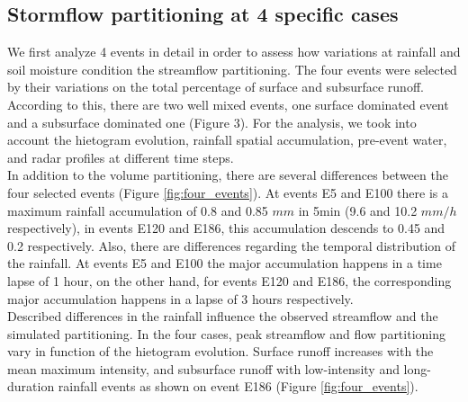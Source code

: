 \documentclass[preprint,12pt]{elsarticle}
\begin{document}
\subsection{Stormflow partitioning at 4 specific cases}

We first analyze 4 events in detail in order to assess how variations at rainfall and soil moisture condition the streamflow partitioning. The four events were selected by their variations on the total percentage of surface and subsurface runoff.  According to this, there are two well mixed events, one surface dominated event and a subsurface dominated one (Figure 3). For the analysis, we took into account the hietogram evolution, rainfall spatial accumulation, pre-event water, and radar profiles at different time steps.\\

In addition to the volume partitioning, there are several differences between the four selected events (Figure \ref{fig:four_events}).  At events E5 and E100 there is a maximum rainfall accumulation of 0.8 and 0.85 $mm$ in 5min (9.6 and 10.2 $mm/h$ respectively), in events E120 and E186, this accumulation descends to 0.45 and 0.2 respectively.   Also, there are differences regarding the temporal distribution of the rainfall.  At events E5 and E100 the major accumulation happens in a time lapse of 1 hour,  on the other hand, for events E120 and E186, the corresponding major accumulation happens in a lapse of  3 hours respectively.\\

Described differences in the rainfall influence the observed streamflow and the simulated partitioning.  In the four cases, peak streamflow and flow partitioning vary in function of the hietogram evolution.  Surface runoff increases with the mean maximum intensity, and subsurface runoff with low-intensity and long-duration rainfall events as shown on event E186 (Figure \ref{fig:four_events}).\\
\end{document}
